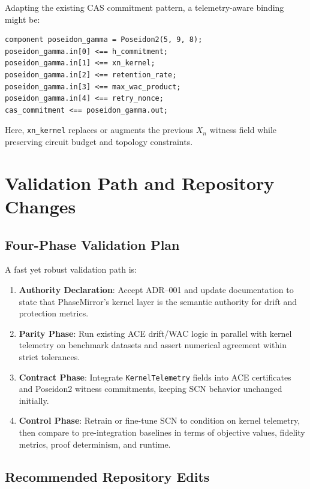 \documentclass[11pt]{article}
\begin{document}
Adapting the existing CAS commitment pattern, a telemetry-aware binding might be:

\begin{lstlisting}[style=code]
component poseidon_gamma = Poseidon2(5, 9, 8);
poseidon_gamma.in[0] <== h_commitment;
poseidon_gamma.in[1] <== xn_kernel;
poseidon_gamma.in[2] <== retention_rate;
poseidon_gamma.in[3] <== max_wac_product;
poseidon_gamma.in[4] <== retry_nonce;
cas_commitment <== poseidon_gamma.out;
\end{lstlisting}

Here, \texttt{xn\_kernel} replaces or augments the previous \(X_n\) witness field while preserving circuit budget and topology constraints.

\section{Validation Path and Repository Changes}

\subsection{Four-Phase Validation Plan}

A fast yet robust validation path is:

\begin{enumerate}[leftmargin=*]
  \item \textbf{Authority Declaration}: Accept ADR--001 and update documentation to state that PhaseMirror's kernel layer is the semantic authority for drift and protection metrics.
  \item \textbf{Parity Phase}: Run existing ACE drift/WAC logic in parallel with kernel telemetry on benchmark datasets and assert numerical agreement within strict tolerances.
  \item \textbf{Contract Phase}: Integrate \texttt{KernelTelemetry} fields into ACE certificates and Poseidon2 witness commitments, keeping SCN behavior unchanged initially.
  \item \textbf{Control Phase}: Retrain or fine-tune SCN to condition on kernel telemetry, then compare to pre-integration baselines in terms of objective values, fidelity metrics, proof determinism, and runtime.
\end{enumerate}

\subsection{Recommended Repository Edits}
\end{document}
